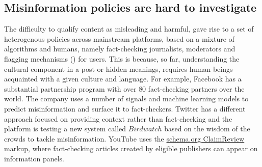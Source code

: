 \documentclass[Afour,sageh,times]{sagej}
\begin{document}
\subsection{Misinformation policies are hard to investigate}
The difficulty to qualify content as misleading and harmful, gave rise to a set of heterogenous policies across mainstream platforms, based on a mixture of algorithms and humans, namely fact-checking journalists, moderators and flagging mechanisms (\cite{crawford2016flag}) for users. This is because, so far, understanding the cultural component in a post or hidden meanings, requires human beings acquainted with a given culture and language. For example, Facebook has a substantial partnership program with over $80$ fact-checking partners over the world. The company uses a number of signals and machine learning models to predict misinformation and surface it to fact-checkers. Twitter has a different approach focused on providing context rather than fact-checking and the platform is testing a new system called $Birdwatch$ based on the wisdom of the crowds to tackle misinformation. YouTube uses the \href{https://schema.org/ClaimReview}{schema.org ClaimReview} markup, where fact-checking articles created by eligible publishers can appear on information panels.
%
\end{document}
